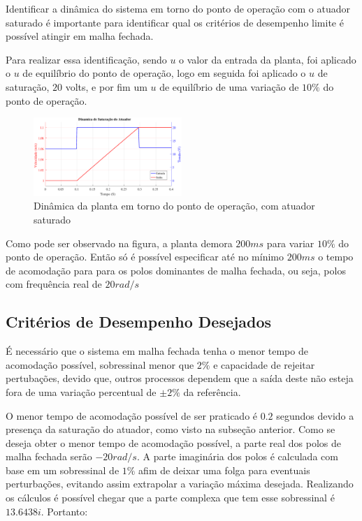 \documentclass[conference,harvard,brazil,english]{sbatex}
\begin{document}
                Identificar a dinâmica do sistema em torno do ponto de operação com o atuador saturado é importante para identificar qual os critérios de desempenho limite é possível atingir em malha fechada.
                
                Para realizar essa identificação, sendo $u$ o valor da entrada da planta, foi aplicado o $u$ de equilíbrio do ponto de operação, logo em seguida foi aplicado o $u$ de saturação, $20$ volts, e por fim um $u$ de equilíbrio de uma variação de $10\%$ do ponto de operação.
                
                \begin{figure}[H]
                    \centering
                    \includegraphics[width=0.5\textwidth]{imagens/identValidSat/dinamicaSaturacaoAtuador.eps}
                    \caption{Dinâmica da planta em torno do ponto de operação, com atuador saturado}
                    \label{fig:dinamicasaturada}
                \end{figure}
                
                Como pode ser observado na figura, a planta demora $200ms$ para variar $10\%$ do ponto de operação. Então só é possível especificar até no mínimo $200ms$ o tempo de acomodação para para os polos dominantes de malha fechada, ou seja, polos com frequência real de $20rad/s$
            
                
        \subsection{Critérios de Desempenho Desejados}
        
            É necessário que o sistema em malha fechada tenha o menor tempo de acomodação possível, sobressinal menor que $2\%$ e capacidade de rejeitar pertubações, devido que, outros processos dependem que a saída deste não esteja fora de uma variação percentual de $\pm 2\%$ da referência.
            
            O menor tempo de acomodação possível de ser praticado é $0.2$ segundos devido a presença da saturação do atuador, como visto na subseção anterior. Como se deseja obter o menor tempo de acomodação possível, a parte real dos polos de malha fechada serão $-20 rad/s$. A parte imaginária dos polos é calculada com base em um sobressinal de $1\%$ afim de deixar uma folga para eventuais perturbações, evitando assim extrapolar a variação máxima desejada. Realizando os cálculos é possível chegar que a parte complexa que tem esse sobressinal é $13.6438i$. Portanto:
            
\end{document}
